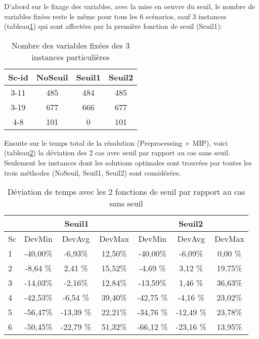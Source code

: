 D'abord sur le fixage des variables, avec la mise en oeuvre du seuil, le nombre de variables fixées reste le même pour tous les 6 scénarios, sauf 3 instances (tableau\ref{tab_cut2_seuil_fix_cmp}) qui sont affectées par la première fonction de seuil (Seuil1):
\begin{table}[h]
    \centering
    \begin{tabular}{|c|c|c|c|}
    	\hline
Sc-id& 	NoSeuil	& Seuil1	& Seuil2\\ \hline
3-11 & 	485	& 484	& 485      \\ \hline
3-19 & 	677	& 666	& 677      \\ \hline
4-8 & 	101	& 0	& 101     		\\ \hline
    \end{tabular}
    \caption{Nombre des variables fixées des 3 instances particulières}
    \label{tab_cut2_seuil_fix_cmp}
\end{table}
\bigskip

Ensuite sur le temps total de la résolution (Preprocessing + MIP), voici (tableau\ref{tab_cut2_seuil_tim_cmp}) la déviation des 2 cas avec seuil par rapport au cas sans seuil. Seulement les instances dont les solutions optimales sont trouvées par toutes les trois méthodes (NoSeuil, Seuil1, Seuil2) sont considérées.
\begin{table}[h]
    \centering
    \begin{tabular}{|l|c|c|c|c|c|c|}
    	\hline
  &\multicolumn{3}{c}{Seuil1}	&\multicolumn{3}{|c|}{Seuil2}\\ \hline
 Sc  & 	DevMin	& DevAvg	& DevMax& 	DevMin	& DevAvg	&DevMax  \\ \hline
1&	-40,00\%&	-6,93\%&	12,50\%&	-40,00\%&	-6,09\%&	0,00 \%    \\ \hline
2&	-8,64 \%&	2,41 \%&	15,52\%&	-4,69 \%&	3,12 \%&	19,75\%     \\ \hline
3&	-14,03\%&	-2,16\%&	12,84\%&	-13,59\%&	1,46 \%&	36,63\%  \\ \hline
4 & -42,53\%	&	-6,54	\% &39,40\% &	-42,75	\% &-4,16	\% &23,02\%    \\ \hline
5 & -56,47\%	&	-13,39	\% &22,21\% &	-34,76	\% &-12,49	\% &23,78\%     \\ \hline
6  & -50,45\%	&	-22,79	\%& 51,32\%& 	-66,12	\%& -23,16	\%& 13,95\%  \\ \hline
    \end{tabular}
    \caption{Déviation de temps avec les 2 fonctions de seuil par rapport au cas sans seuil}
    \label{tab_cut2_seuil_tim_cmp}
\end{table}
\bigskip

